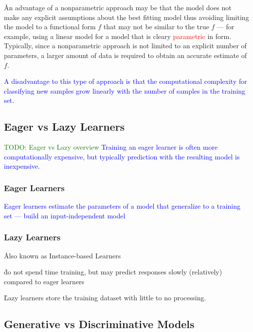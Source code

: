 \r{An advantage of a nonparametric approach may be that the model does not make any explicit assumptions about the best fitting model thus avoiding limiting the model to a functional form $f$ that may not be similar to the true $f$ --- for example, using a linear model for a model that is cleary \textcolor{red}{parametric} in form. Typically, since a nonparametric approach is not limited to an explicit number of parameters, a larger amount of data is required to obtain an accurate estimate of $f$.}

\textcolor{blue}{A disadvantage to this type of approach is that the computational complexity for classifying new samples grow linearly with the number of samples in the training set.}



\subsection{Eager vs Lazy Learners}

\textcolor{green}{TODO: Eager vs Lazy overview}
\textcolor{blue}{Training an eager learner is often more computationally expensive, but typically prediction with the resulting model is inexpensive.}

\subsubsection{Eager Learners}

\textcolor{blue}{Eager learners estimate the parameters of a model that generalize to a training set --- build an input-independent model}

\subsubsection{Lazy Learners}

\r{Also known as Instance-based Learners}

\r{do not spend time training, but may predict responses slowly (relatively) compared to eager learners}

\r{Lazy learners store the training dataset with little to no processing.}


\subsection{Generative vs Discriminative Models}



